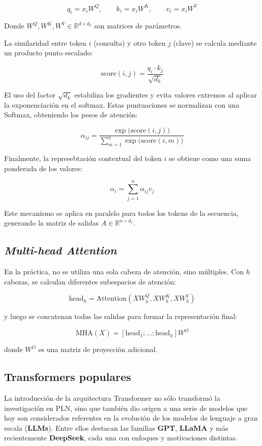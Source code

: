 \[
    q_i = x_i W^Q, \;\;\;\;\;\;\; k_i = x_i W^K, \;\;\;\;\;\;\; v_i = x_i W^V
\]

Donde $W^Q, W^K, W^V \in \mathbb{R}^{d \times d_k}$ son matrices de parámetros.

La similaridad entre token $i$ (consulta) y otro token $j$ (clave) se calcula mediante un producto
punto escalado:

\[
    \text{score}(i,j) = \frac{q_i \cdot k_j}{\sqrt{d_k}}
\]

El uso del factor $\sqrt{d_k}$ estabiliza los gradientes y evita valores extremos al aplicar
la exponenciación en el softmax. Estas puntuaciones se normalizan con una Softmax, obteniendo
los pesos de atención:

\[
    \alpha_{ij} = \frac{\exp \Big(\text{score}(i,j)\Big)}{\sum_{m=1}^{n} \exp \Big(\text{score}(i,m)\Big)}
\]

Finalmente, la represebtación contextual del token $i$ se obtiene como una suma ponderada
de los valores:

\[
    \alpha_i = \sum_{j=1}^{n} \alpha_{ij} v_j
\]

Este mecanismo se aplica en paralelo para todos los tokens de la secuencia, generando la matriz
de salidas $A \in \mathbb{R}^{n \times d_v}$.

\subsection{\textit{Multi-head Attention}}

En la pr\'actica, no se utiliza una sola cabeza de atenci\'on, sino m\'ultiples. Con $h$ cabezas, se calculan diferentes subespacios de atenci\'on:

$$\text{head}_h = \text{Attention}(XW^Q_h, XW^K_h, XW^V_h)$$

y luego se concatenan todas las salidas para formar la representaci\'on final:

$$\text{MHA}(X) = [\text{head}_1; \dots; \text{head}_h] W^O$$

donde $W^O$ es una matriz de proyecci\'on adicional.

\subsection{Transformers populares}

La introducci\'on de la arquitectura Transformer no s\'olo transform\'o la investigaci\'on en PLN, sino que tambi\'en dio origen a una serie de modelos que hoy son considerados referentes en la evoluci\'on de los modelos de lenguaje a gran escala (\textbf{LLMs}). Entre ellos destacan las familias \textbf{GPT}, \textbf{LLaMA} y m\'as recientemente \textbf{DeepSeek}, cada una con enfoques y motivaciones distintas.

